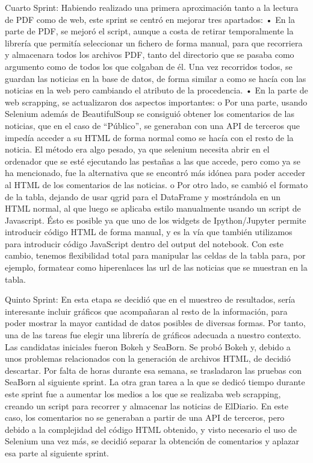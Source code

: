 Cuarto Sprint:
Habiendo realizado una primera aproximación tanto a la lectura de PDF como de web, este sprint se centró en mejorar tres apartados:
•	En la parte de PDF, se mejoró el script, aunque a costa de retirar temporalmente la librería que permitía seleccionar un fichero de forma manual, para que recorriera y almacenara todos los archivos PDF, tanto del directorio que se pasaba como argumento como de todos los que colgaban de él. Una vez recorridos todos, se guardan las noticias en la base de datos, de forma similar a como se hacía con las noticias en la web pero cambiando el atributo de la procedencia.
•	En la parte de web scrapping, se actualizaron dos aspectos importantes:
o	Por una parte, usando Selenium además de BeautifulSoup se consiguió obtener los comentarios de las noticias, que en el caso de “Público”, se generaban con una API de terceros que impedía acceder a su HTML de forma normal como se hacía con el resto de la noticia. El método era algo pesado, ya que selenium necesita abrir en el ordenador que se esté ejecutando las pestañas a las que accede, pero como ya se ha mencionado, fue la alternativa que se encontró más idónea para poder acceder al HTML de los comentarios de las noticias.
o	Por otro lado, se cambió el formato de la tabla, dejando de usar qgrid para el DataFrame y mostrándola en un HTML normal, al que luego se aplicaba estilo manualmente usando un script de Javascript. Ésto es posible ya que uno de los widgets de Ipython/Jupyter permite introducir código HTML de forma manual, y es la vía que también utilizamos para introducir código JavaScript dentro del output del notebook. Con este cambio, tenemos flexibilidad total para manipular las celdas de la tabla para, por ejemplo, formatear como hiperenlaces las url de las noticias que se muestran en la tabla.

Quinto Sprint:
En esta etapa se decidió que en el muestreo de resultados, sería interesante incluir gráficos que acompañaran al resto de la información, para poder mostrar la mayor cantidad de datos posibles de diversas formas. Por tanto, una de las tareas fue elegir una librería de gráficos adecuada a nuestro contexto. 
Las candidatas iniciales fueron Bokeh y SeaBorn. Se probó Bokeh y, debido a unos problemas relacionados con la generación de archivos HTML, de decidió descartar. Por falta de horas durante esa semana, se trasladaron las pruebas con SeaBorn al siguiente sprint.
La otra gran tarea a la que se dedicó tiempo durante este sprint fue a aumentar los medios a los que se realizaba web scrapping, creando un script para recorrer y almacenar las noticias de ElDiario. En este caso, los comentarios no se generaban a partir de una API de terceros, pero debido a la complejidad del código HTML obtenido, y visto necesario el uso de Selenium una vez más, se decidió separar la obtención de comentarios y aplazar esa parte al siguiente sprint.

